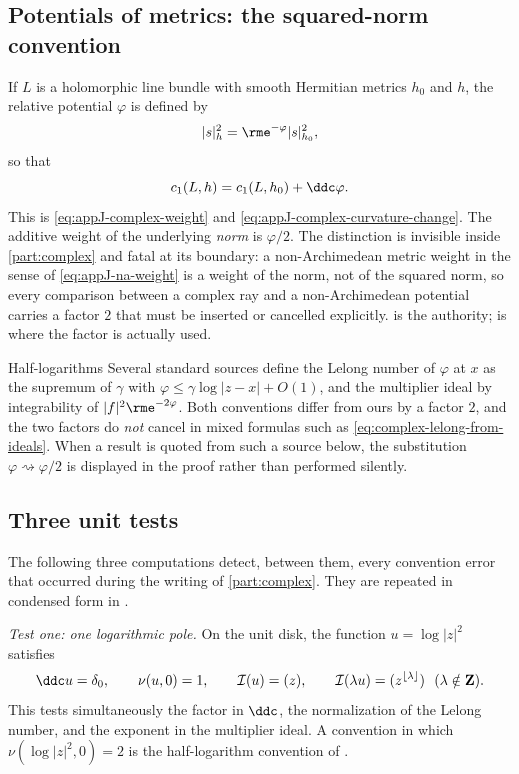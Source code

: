 \subsection{Potentials of metrics: the squared-norm convention}
\label{sec:ch51-squared-norm}

If \(L\) is a holomorphic line bundle with smooth Hermitian metrics
\(h_0\) and \(h\), the relative potential \(\varphi\) is defined by
\[
 |s|_h^2=\rme^{-\varphi}|s|_{h_0}^2 ,
\]
so that
\[
 c_1(L,h)=c_1(L,h_0)+\ddc\varphi .
\]
This is \eqref{eq:appJ-complex-weight} and
\eqref{eq:appJ-complex-curvature-change}.  The additive weight of the
underlying \emph{norm} is \(\varphi/2\).  The distinction is invisible
inside \cref{part:complex} and fatal at its boundary: a non-Archimedean
metric weight in the sense of \eqref{eq:appJ-na-weight} is a weight of the
norm, not of the squared norm, so every comparison between a complex ray
and a non-Archimedean potential carries a factor \(2\) that must be
inserted or cancelled explicitly.   is the
authority;  is where the factor is actually
used.

\begin{warning}{Half-logarithms}
\label{warn:ch51-half-log}
Several standard sources define the Lelong number of \(\varphi\) at \(x\)
as the supremum of \(\gamma\) with
\(\varphi\leq\gamma\log|z-x|+O(1)\), and the multiplier ideal by
integrability of \(|f|^2\rme^{-2\varphi}\).  Both conventions differ from
ours by a factor \(2\), and the two factors do \emph{not} cancel in mixed
formulas such as \eqref{eq:complex-lelong-from-ideals}.  When a result is
quoted from such a source below, the substitution
\(\varphi\rightsquigarrow\varphi/2\) is displayed in the proof rather than
performed silently.
\end{warning}

\subsection{Three unit tests}
\label{sec:ch51-unit-tests}

The following three computations detect, between them, every convention
error that occurred during the writing of \cref{part:complex}.  They are
repeated in condensed form in .

\emph{Test one: one logarithmic pole.}  On the unit disk, the function
\(u=\log|z|^2\) satisfies
\[
 \ddc u=\delta_0,\qquad \nu(u,0)=1,\qquad
 \mathcal I(u)=(z),\qquad \mathcal I(\lambda u)=(z^{\lfloor\lambda\rfloor})
 \ \ (\lambda\notin\mathbf Z).
\]
This tests simultaneously the factor in \(\ddc\), the normalization of the
Lelong number, and the exponent in the multiplier ideal.  A convention in
which \(\nu(\log|z|^2,0)=2\) is the half-logarithm convention of
.

